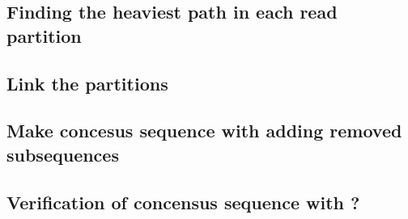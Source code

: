 \subsection{Finding the heaviest path in each read partition}

\subsection{Link the partitions}

\subsection{Make concesus sequence with adding removed subsequences}

\subsection{Verification of concensus sequence with ?}

\newpage